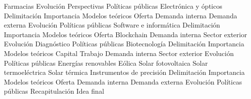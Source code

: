 \documentclass{nuevotema}
\begin{document}
\begin{esquema}[enumerate]
			\3 Farmacias
			\3 Evolución
			\3 Perspectivas
			\3 Políticas públicas
		\2 Electrónica y ópticos
			\3 Delimitación
			\3 Importancia
			\3 Modelos teóricos
			\3 Oferta
			\3 Demanda interna
			\3 Demanda externa
			\3 Evolución
			\3 Políticas públicas
		\2 Software e informática
			\3 Delimitación
			\3 Importancia
			\3 Modelos teóricos
			\3 Oferta
			\3 Blockchain
			\3 Demanda interna
			\3 Sector exterior
			\3 Evolución
			\3 Diagnóstico
			\3 Políticas públicas
		\2 Biotecnología
			\3 Delimitación
			\3 Importancia
			\3 Modelos teóricos
			\3 Capital
			\3 Trabajo
			\3 Demanda interna
			\3 Sector exterior
			\3 Evolución
			\3 Políticas públicas
		\2 Energías renovables
			\3 Eólica
			\3 Solar fotovoltaica
			\3 Solar termoeléctrica
			\3 Solar térmica
		\2 Instrumentos de precisión
			\3 Delimitación
			\3 Importancia
			\3 Modelos teóricos
			\3 Oferta
			\3 Demanda interna
			\3 Demanda externa
			\3 Evolución
			\3 Políticas públicas
	\1[] 
		\2 Recapitulación
		\2 Idea final

\end{esquema}

\esquemalargo
\end{document}
